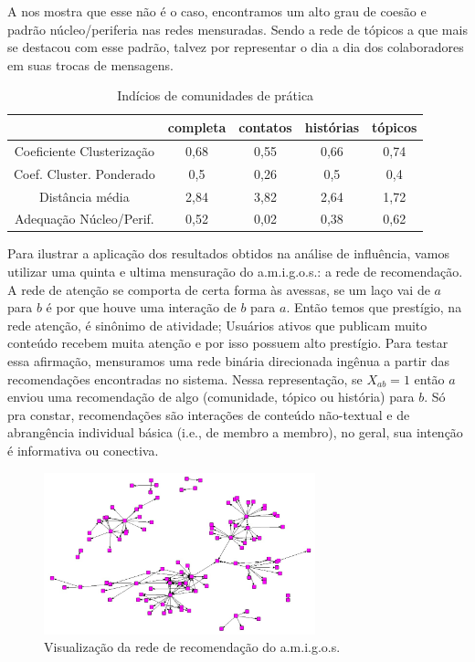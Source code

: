 A  nos mostra que esse não é o caso,
encontramos um alto grau de coesão e padrão núcleo/periferia nas redes
mensuradas. Sendo a rede de tópicos a que mais se destacou com esse padrão,
talvez por representar o dia a dia dos colaboradores em suas trocas de
mensagens.

\begin{table}[htbp]
	\setlength{\arrayrulewidth}{2\arrayrulewidth}  %
	\setlength{\belowcaptionskip}{10pt}  %
	\caption{Indícios de comunidades de prática} \centering   
	\begin{tabular}{| c | c | c | c | c |}
	\hline
	 & completa & contatos & histórias & tópicos \\ \hline
	Coeficiente Clusterização & 0,68 & 0,55 & 0,66 & 0,74 \\
	Coef. Cluster. Ponderado & 0,5 & 0,26 & 0,5 & 0,4 \\
	Distância média & 2,84 & 3,82 & 2,64 & 1,72 \\
	Adequação Núcleo/Perif. & 0,52 & 0,02 & 0,38 & 0,62 \\\hline
	\end{tabular}
	\label{ap:tab:comu_prat}
\end{table}

Para ilustrar a aplicação dos resultados obtidos na análise de influência, vamos
utilizar uma quinta e ultima mensuração do a.m.i.g.o.s.: a rede de recomendação.
A rede de atenção se comporta de certa forma às avessas, se um laço vai de $a$
para $b$ é por que houve uma interação de $b$ para $a$. Então temos que
prestígio, na rede atenção, é sinônimo de atividade; Usuários ativos que publicam
muito conteúdo recebem muita atenção e por isso possuem alto prestígio. Para
testar essa afirmação, mensuramos uma rede binária direcionada ingênua a partir
das recomendações encontradas no sistema. Nessa representação, se $X_{ab}=1$
então $a$ enviou uma recomendação de algo (comunidade, tópico ou história) para
$b$. Só pra constar, recomendações são interações de conteúdo não-textual e de
abrangência individual básica (i.e., de membro a membro), no geral, sua intenção
é informativa ou conectiva.

\begin{figure}[h!]
  \centering
    \includegraphics[width=0.7\textwidth]{imgs/recmd.jpg}
  \caption{Visualização da rede de recomendação do a.m.i.g.o.s.}
    \label{ap:fig:recmd}
\end{figure}

